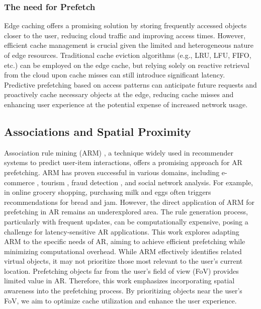     \subsubsection*{The need for Prefetch}
        Edge caching offers a promising solution by storing frequently accessed objects closer to the user, reducing cloud traffic and improving access times. However, efficient cache management is crucial given the limited and heterogeneous nature of edge resources.  Traditional cache eviction algorithms (e.g., LRU, LFU, FIFO, etc.) can be employed on the edge cache, but relying solely on reactive retrieval from the cloud upon cache misses can still introduce significant latency. Predictive prefetching based on access patterns can anticipate future requests and proactively cache necessary objects at the edge, reducing cache misses and enhancing user experience at the potential expense of increased network usage.
        
    \vspace{-1.5mm}
    \subsection{Associations and Spatial Proximity}
        Association rule mining (ARM) \cite{bib:arm}, a technique widely used in recommender systems to predict user-item interactions, offers a promising approach for AR prefetching. ARM has proven successful in various domains, including e-commerce \cite{bib:phara}, tourism \cite{bib:dublin}, fraud detection \cite{bib:fraud}, and social network analysis\cite{bib:sna}. For example, in online grocery shopping, purchasing milk and eggs often triggers recommendations for bread and jam. However, the direct application of ARM for prefetching in AR remains an underexplored area.  The rule generation process, particularly with frequent updates, can be computationally expensive, posing a challenge for latency-sensitive AR applications. This work explores adapting ARM to the specific needs of AR, aiming to achieve efficient prefetching while minimizing computational overhead. While ARM effectively identifies related virtual objects, it may not prioritize those most relevant to the user's current location. Prefetching objects far from the user's field of view (FoV) provides limited value in AR. Therefore, this work emphasizes incorporating spatial awareness into the prefetching process. By prioritizing objects near the user's FoV, we aim to optimize cache utilization and enhance the user experience.
        
